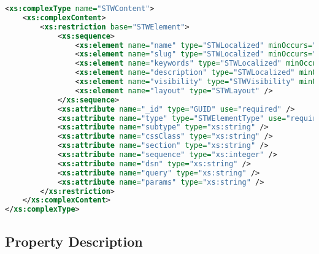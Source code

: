 \begin{lstlisting}[language=XML,caption={STWContent XSD Definition}]
<xs:complexType name="STWContent">
    <xs:complexContent>
        <xs:restriction base="STWElement">
            <xs:sequence>
                <xs:element name="name" type="STWLocalized" minOccurs="1" />
                <xs:element name="slug" type="STWLocalized" minOccurs="1" />
                <xs:element name="keywords" type="STWLocalized" minOccurs="0" />
                <xs:element name="description" type="STWLocalized" minOccurs="0" />
                <xs:element name="visibility" type="STWVisibility" minOccurs="0" />
                <xs:element name="layout" type="STWLayout" />
            </xs:sequence>
            <xs:attribute name="_id" type="GUID" use="required" />
            <xs:attribute name="type" type="STWElementType" use="required" fixed="Content" />
            <xs:attribute name="subtype" type="xs:string" />
            <xs:attribute name="cssClass" type="xs:string" />
            <xs:attribute name="section" type="xs:string" />
            <xs:attribute name="sequence" type="xs:integer" />
            <xs:attribute name="dsn" type="xs:string" />
            <xs:attribute name="query" type="xs:string" />
            <xs:attribute name="params" type="xs:string" />
        </xs:restriction>
    </xs:complexContent>
</xs:complexType>
\end{lstlisting}

\subsection{Property Description}


